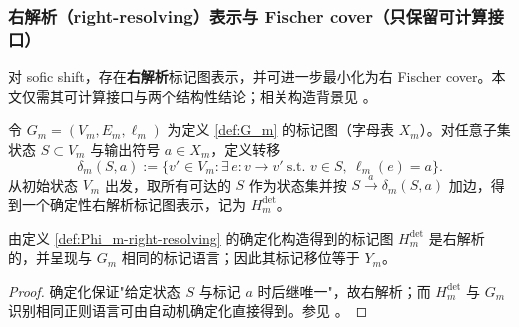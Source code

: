 \subsubsection{右解析（right-resolving）表示与 Fischer cover（只保留可计算接口）}\label{subsubsec:Phi_m-right-resolving-fischer-cover}
对 sofic shift，存在\textbf{右解析}标记图表示，并可进一步最小化为右 Fischer cover。本文仅需其可计算接口与两个结构性结论；相关构造背景见 \cite{LindMarcus1995,Kitchens1998SymbolicDynamics}。

\begin{definition}[右解析表示的确定化口径]\label{def:Phi_m-right-resolving}
令 $G_m=(V_m,E_m,\ell_m)$ 为定义 \ref{def:G_m} 的标记图（字母表 $X_m$）。对任意子集状态 $S\subset V_m$ 与输出符号 $a\in X_m$，定义转移
\[
\delta_m(S,a):=\{v'\in V_m:\exists\,e:v\to v'\ \text{s.t. } v\in S,\ \ell_m(e)=a\}.
\]
从初始状态 $V_m$ 出发，取所有可达的 $S$ 作为状态集并按 $S\xrightarrow{a}\delta_m(S,a)$ 加边，得到一个确定性右解析标记图表示，记为 $H_m^{\mathrm{det}}$。
\end{definition}

\begin{proposition}[右解析表示的存在与等价]\label{prop:Phi_m-right-resolving}
由定义 \ref{def:Phi_m-right-resolving} 的确定化构造得到的标记图 $H_m^{\mathrm{det}}$ 是右解析的，并呈现与 $G_m$ 相同的标记语言；因此其标记移位等于 $Y_m$。
\end{proposition}

\begin{proof}
确定化保证"给定状态 $S$ 与标记 $a$ 时后继唯一"，故右解析；而 $H_m^{\mathrm{det}}$ 与 $G_m$ 识别相同正则语言可由自动机确定化直接得到。参见 \cite{LindMarcus1995,Kitchens1998SymbolicDynamics}。
\end{proof}
